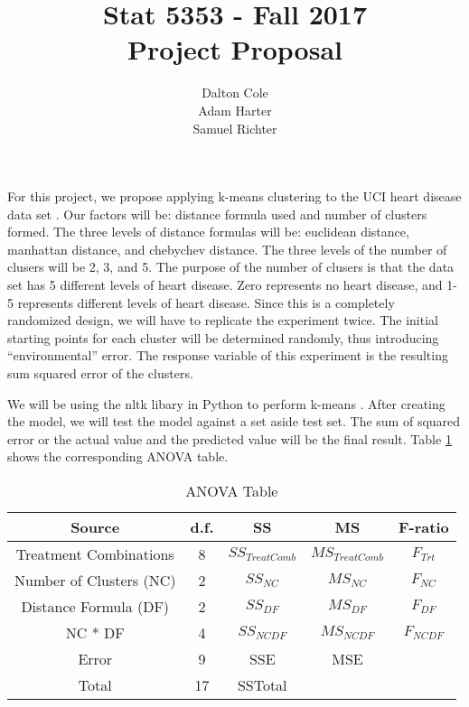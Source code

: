 \documentclass[times]{article}
\begin{document}
	\title{Stat 5353  - Fall 2017 \\ Project Proposal}
	\author{Dalton Cole \\ Adam Harter \\ Samuel Richter}
	\date{}
	\maketitle
	
	For this project, we propose applying k-means clustering to the UCI heart disease data set \cite{ref:uci}. Our factors will be: distance formula used and number of clusters formed. The three levels of distance formulas will be: euclidean distance, manhattan distance, and chebychev distance. The three levels of the number of clusers will be 2, 3, and 5. The purpose of the number of clusers is that the data set has 5 different levels of heart disease. Zero represents no heart disease, and 1-5 represents different levels of heart disease. Since this is a completely randomized design, we will have to replicate the experiment twice. The initial starting points for each cluster will be determined randomly, thus introducing ``environmental'' error. The response variable of this experiment is the resulting sum squared error of the clusters.

	We will be using the nltk libary in Python to perform k-means \cite{ref:nltk}. After creating the model, we will test the model against a set aside test set. The sum of squared error or the actual value and the predicted value will be the final result. Table \ref{tab:anova} shows the corresponding ANOVA table.

	\begin{table}[!h]
		\centering
		\caption{ANOVA Table}
		\label{tab:anova}
		\begin{tabular}{| c | c | c | c | c |}
			\hline
			Source 					& d.f.	& SS	& MS 	& F-ratio \\
			\hline
			Treatment Combinations	& 8		& $SS_{Treat Comb}$	& $MS_{Treat Comb}$	& $F_{Trt}$		\\
			\hline
			Number of Clusters (NC)	& 2		& $SS_{NC}$			& $MS_{NC}$			& $F_{NC}$ 		\\
			\hline
			Distance Formula (DF)	& 2		& $SS_{DF}$			& $MS_{DF}$			& $F_{DF}$ 		\\
			\hline
			NC * DF					& 4 	& $SS_{NC DF}$		& $MS_{NC DF}$		& $F_{NC DF}$ 	\\
			\hline
			Error					& 9 	& SSE				& MSE				& 				\\
			\hline
			Total					& 17 	& SSTotal			& 					& 				\\
			\hline
		\end{tabular}
	\end{table}

	\medskip
	
	
\end{document}
